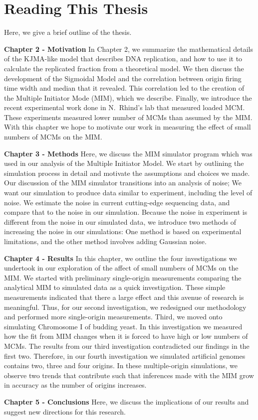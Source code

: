 		
	\section{Reading This Thesis}
	\label{sec:Map}

	Here, we give a brief outline of the thesis.
	
	\textbf{Chapter 2 - Motivation}
	In Chapter 2, we summarize the mathematical details of the KJMA-like model that describes DNA replication, and how to use it to calculate the replicated fraction from a theoretical model.
	We then discuss the development of the Sigmoidal Model and the correlation between origin firing time width and median that it revealed.
	This correlation led to the creation of the Multiple Initiator Mode (MIM), which we describe.
	Finally, we introduce the recent experimental work done in N.~Rhind's lab that measured loaded MCM.
	These experiments measured lower number of MCMs than assumed by the MIM.
	With this chapter we hope to motivate our work in measuring the effect of small numbers of MCMs on the MIM.
	
	\textbf{Chapter 3 - Methods}
	Here, we discuss the MIM simulator program which was used in our analysis of the Multiple Initiator Model.
	We start by outlining the simulation process in detail and motivate the assumptions and choices we made.
	Our discussion of the MIM simulator transitions into an analysis of noise; We want our simulation to produce data similar to experiment, including the level of noise.
	We estimate the noise in current cutting-edge sequencing data, and compare that to the noise in our simulation.
	Because the noise in experiment is different from the noise in our simulated data, we introduce two methods of increasing the noise in our simulations:
	One method is based on experimental limitations, and the other method involves adding Gaussian noise.
	
	\textbf{Chapter 4 - Results}
	In this chapter, we outline the four investigations we undertook in our exploration of the affect of small numbers of MCMs on the MIM.
	We started with preliminary single-origin measurements comparing the analytical MIM to simulated data as a quick investigation.
	These simple measurements indicated that there a large effect and this avenue of research is meaningful.
	Thus, for our second investigation, we redesigned our methodology and performed more single-origin measurements.
	Third, we moved onto simulating Chromosome I of budding yeast.
	In this investigation we measured how the fit from MIM changes when it is forced to have high or low numbers of MCMs.
	The results from our third investigation contradicted our findings in the first two.
	Therefore, in our fourth investigation we simulated artificial genomes contains two, three and four origins.
	In these multiple-origin simulations, we observe two trends that contribute such that inferences made with the MIM grow in accuracy as the number of origins increases.
	
	\textbf{Chapter 5 - Conclusions}
	Here, we discuss the implications of our results and suggest new directions for this research.
		
		
		
		
		
		
		
		
		